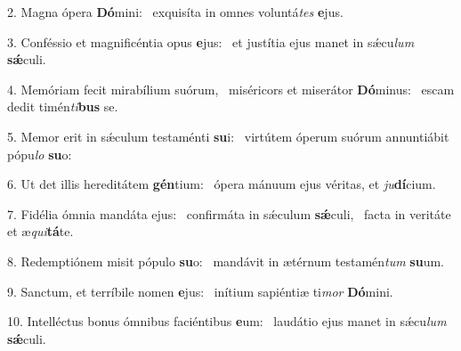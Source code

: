 2. Magna ópera \textbf{Dó}mini: \ast\  exquisíta in omnes voluntá\textit{tes} \textbf{e}jus.\

3. Conféssio et magnificéntia opus \textbf{e}jus: \ast\  et justítia ejus manet in sǽcu\textit{lum} \textbf{sǽ}culi.\

4. Memóriam fecit mirabílium suórum, \dag\  miséricors et miserátor \textbf{Dó}minus: \ast\  escam dedit timén\textit{ti}\textbf{bus} se.\

5. Memor erit in sǽculum testaménti \textbf{su}i: \ast\  virtútem óperum suórum annuntiábit pópu\textit{lo} \textbf{su}o:\

6. Ut det illis hereditátem \textbf{gén}tium: \ast\  ópera mánuum ejus véritas, et \textit{ju}\textbf{dí}cium.\

7. Fidélia ómnia mandáta ejus: \dag\  confirmáta in sǽculum \textbf{sǽ}culi, \ast\  facta in veritáte et æ\textit{qui}\textbf{tá}te.\

8. Redemptiónem misit pópulo \textbf{su}o: \ast\  mandávit in ætérnum testamén\textit{tum} \textbf{su}um.\

9. Sanctum, et terríbile nomen \textbf{e}jus: \ast\  inítium sapiéntiæ ti\textit{mor} \textbf{Dó}mini.\

10. Intelléctus bonus ómnibus faciéntibus \textbf{e}um: \ast\  laudátio ejus manet in sǽcu\textit{lum} \textbf{sǽ}culi.\

